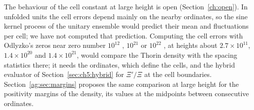 The behaviour of the cell constant at large height is open (Section~\ref{ch:open}). In unfolded units the cell errors depend mainly on the nearby ordinates, so the sine kernel process of the unitary ensemble would predict their mean and fluctuations per cell; we have not computed that prediction. Computing the cell errors with Odlyzko's zeros near zero number $10^{12}$ \cite{Odlyzko87}, $10^{21}$ or $10^{22}$ \cite{Odlyzko01,OdlyzkoTables}, at heights about $2.7\times10^{11}$, $1.4\times10^{20}$ and $1.4\times10^{21}$, would compare the Thorin density with the spacing statistics there; it needs the ordinates, which define the cells, and the hybrid evaluator of Section~\ref{sec:ch5:hybrid} for $\Xi'/\Xi$ at the cell boundaries. Section~\ref{ag:sec:margins} proposes the same comparison at large height for the positivity margins of the density, its values at the midpoints between consecutive ordinates.
